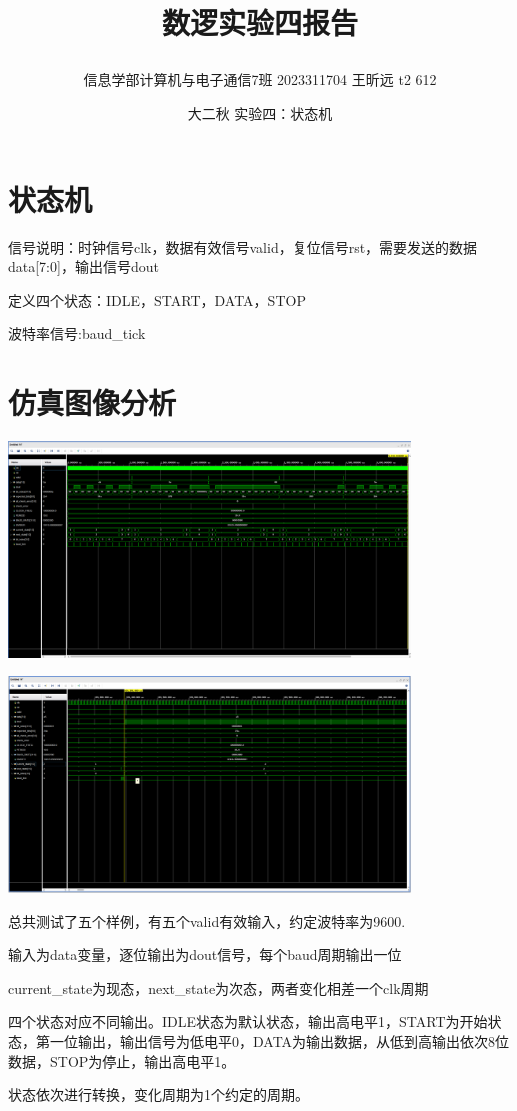 \documentclass{article} %
\begin{document}
    \title{\centerline{数逻实验四报告}}
    \date{大二秋 实验四：状态机}
    \author{信息学部计算机与电子通信7班 2023311704 王昕远 t2 612}
    \maketitle
    \thispagestyle{empty}


\section{状态机}

信号说明：时钟信号clk，数据有效信号valid，复位信号rst，需要发送的数据data[7:0]，输出信号dout\par
定义四个状态：IDLE，START，DATA，STOP\par
波特率信号:baud\_tick\par
\section{仿真图像分析}
\includegraphics[width=0.8\textwidth]{1.png}\par
\includegraphics[width=0.8\textwidth]{2.png}\par
总共测试了五个样例，有五个valid有效输入，约定波特率为9600.\par
输入为data变量，逐位输出为dout信号，每个baud周期输出一位\par
current\_state为现态，next\_state为次态，两者变化相差一个clk周期\par
四个状态对应不同输出。IDLE状态为默认状态，输出高电平1，START为开始状态，第一位输出，输出信号为低电平0，DATA为输出数据，从低到高输出依次8位数据，STOP为停止，输出高电平1。\par
状态依次进行转换，变化周期为1个约定的周期。\par
\end{document}
